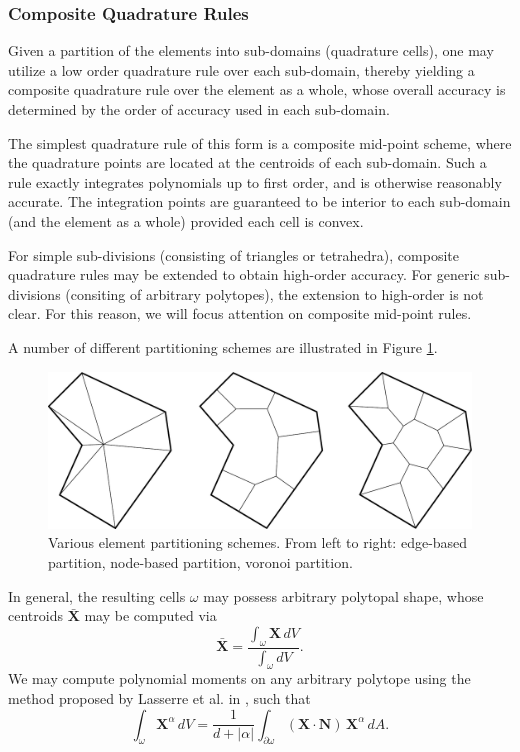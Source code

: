 	\subsubsection*{Composite Quadrature Rules}
	
	Given a partition of the elements into sub-domains (quadrature cells), one may utilize a low order quadrature rule over each sub-domain, thereby yielding a composite quadrature rule over the element as a whole, whose overall accuracy is determined by the order of accuracy used in each sub-domain.
	
	The simplest quadrature rule of this form is a composite mid-point scheme, where the quadrature points are located at the centroids of each sub-domain. Such a rule exactly integrates polynomials up to first order, and is otherwise reasonably accurate. The integration points are guaranteed to be interior to each sub-domain (and the element as a whole) provided each cell is convex.
	
	For simple sub-divisions (consisting of triangles or tetrahedra), composite quadrature rules may be extended to obtain high-order accuracy. For generic sub-divisions (consiting of arbitrary polytopes), the extension to high-order is not clear. For this reason, we will focus attention on composite mid-point rules.
	
	A number of different partitioning schemes are illustrated in Figure \ref{fig:partitioning_types}.
	\begin{figure} [!ht]
		\centering
		\includegraphics[width = 6.0in]{figures/partition_types.pdf}
		\caption{Various element partitioning schemes. From left to right: edge-based partition, node-based partition, voronoi partition.}
		\label{fig:partitioning_types}
	\end{figure}
	In general, the resulting cells $\omega$ may possess arbitrary polytopal shape, whose centroids $\bar{\mathbf{X}}$ may be computed via
	\begin{equation}
		\bar{\mathbf{X}} = \frac{\int_{\omega} \mathbf{X} \, dV}{\int_{\omega} dV}.
	\end{equation}
	We may compute polynomial moments on any arbitrary polytope using the method proposed by Lasserre et al. in \cite{Chin:15}, such that
	\begin{equation}
		\int_{\omega} \mathbf{X}^\alpha \, dV = \frac{1}{d+|\alpha|} \int_{\partial \omega} (\mathbf{X} \cdot \mathbf{N}) \, \mathbf{X}^\alpha \, dA.
	\end{equation}
		
